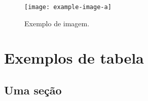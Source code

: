 \documentclass[
	10pt,				%
	openright,			%
	twoside,			%
	a5paper,			%
	english,			%
	french,				%
	brazil,				%
	sumario=tradicional
]{abntex2}
\begin{document}
\lipsum[1]

\begin{figure}
\centering
\texttt{[image: example-image-a]}
\caption{Exemplo de imagem.}
\label{fig:exemplo}
\end{figure}

\lipsum[6]





\lipsum[7]

\chapter{Exemplos de tabela}

\section{Uma seção}

\lipsum[8]
\end{document}
